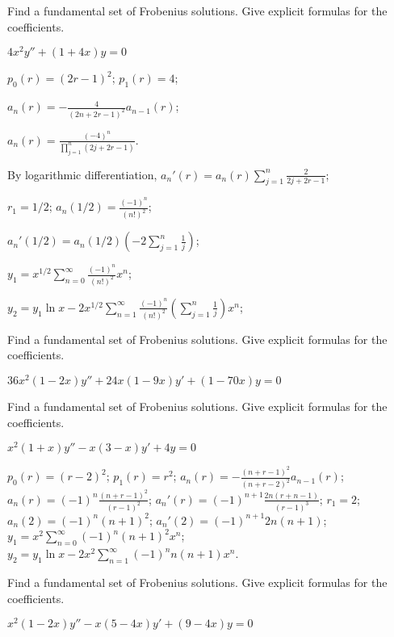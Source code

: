 \documentclass{ximera}
\begin{document}
\begin{problem}\label{exer:7.6.12}
Find a fundamental set of Frobenius  solutions.
Give explicit formulas for the coefficients.

$4x^2y''+(1+4x)y=0$

\begin{solution}
    $p_0(r)=(2r-1)^2$;
$p_1(r)=4$;

$a_n(r)=-\frac{4}{(2n+2r-1)^2}a_{n-1}(r)$;

 $a_n(r)=\frac{(-4)^n}{\prod_{j=1}^n(2j+2r-1)}$.

By logarithmic differentiation,
$a_n'(r)=a_n(r)\sum_{j=1}^n\frac{2}{2j+2r-1}$;

$r_1=1/2$;
$a_n(1/2)=\frac{(-1)^n}{(n!)^2}$;

$a_n'(1/2)=a_n(1/2)\left(-2\sum_{j=1}^n\frac{1}{ j}\right)$;

$y_1=x^{1/2}\sum_{n=0}^\infty \frac{(-1)^n}{(n!)^2}x^n$;

$y_2=y_1\ln x-2x^{1/2}\sum_{n=1}^\infty
\frac{(-1)^n}{(n!)^2}\left(\sum_{j=1}^n\frac{1}{ j}\right)x^n$;
\end{solution}
\end{problem}

\begin{problem}\label{exer:7.6.13}
Find a fundamental set of Frobenius  solutions.
Give explicit formulas for the coefficients.

$36x^2(1-2x)y''+24x(1-9x)y'+(1-70x)y=0$
\end{problem}

\begin{problem}\label{exer:7.6.14}
Find a fundamental set of Frobenius  solutions.
Give explicit formulas for the coefficients.

$x^2(1+x)y''-x(3-x)y'+4y=0$

\begin{solution}
    $p_0(r)=(r-2)^2$;
$p_1(r)=r^2$;
$a_n(r)=-\frac{(n+r-1)^2}{(n+r-2)^2}a_{n-1}(r)$;
 $a_n(r)=(-1)^n\frac{(n+r-1)^2}{(r-1)^2}$;
$a_n'(r)=(-1)^{n+1}\frac{2n(r+n-1)}{(r-1)^3}$;
$r_1=2$;
$a_n(2)=(-1)^n(n+1)^2$;
$a_n'(2)=(-1)^{n+1}2n(n+1)$;
$y_1=x^2\sum_{n=0}^\infty (-1)^n(n+1)^2x^n$;
$y_2=y_1\ln
x-2x^2\sum_{n=1}^\infty(-1)^nn(n+1)x^n$.

\end{solution}
\end{problem}

\begin{problem}\label{exer:7.6.15}
Find a fundamental set of Frobenius  solutions.
Give explicit formulas for the coefficients.

$x^2(1-2x)y''-x(5-4x)y'+(9-4x)y=0$
\end{problem}
\end{document}
